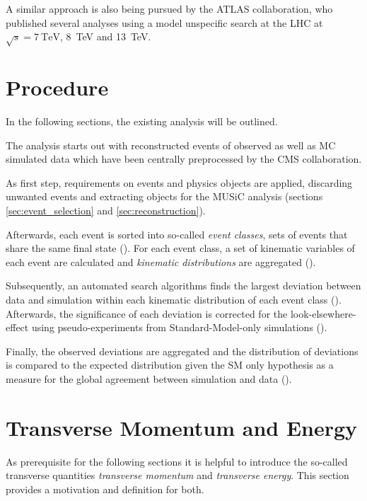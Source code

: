 A similar approach is also being pursued by the \ac{ATLAS} collaboration, who published several analyses using a model unspecific search at the \ac{LHC} at $\sqrt{s} = \SI{7}{\TeV}$\cite{ATLAS:ATLAS-CONF-2012-107}, \SI{8}{\TeV}\cite{ATLAS:ATLAS-CONF-2014-006} and \SI{13}{\TeV}\cite{ATLAS:ATLAS-CONF-2017-001}.

\section{Procedure}
In the following sections, the existing analysis will be outlined.

The analysis starts out with reconstructed events of observed as well as \ac{MC} simulated data which have been centrally preprocessed by the \ac{CMS} collaboration.

As first step, requirements on events and physics objects are applied, discarding unwanted events and extracting objects for the \ac{MUSiC} analysis (sections \ref{sec:event_selection} and \ref{sec:reconstruction}).

Afterwards, each event is sorted into so-called \emph{event classes}, sets of events that share the same final state ().
For each event class, a set of kinematic variables of each event are calculated and \emph{kinematic distributions} are aggregated ().

Subsequently, an automated search algorithms finds the largest deviation between data and simulation within each kinematic distribution of each event class (). Afterwards, the significance of each deviation is corrected for the look-elsewhere-effect using pseudo-experiments from Standard-Model-only simulations (). 

Finally, the observed deviations are aggregated and the distribution of deviations is compared to the expected distribution given the \ac{SM} only hypothesis as a measure for the global agreement between simulation and data ().

\section{Transverse Momentum and Energy}
\label{sec:transverse_quantities}

As prerequisite for the following sections it is helpful to introduce the so-called transverse quantities \emph{transverse momentum} and \emph{transverse energy}. This section provides a motivation and definition for both.

